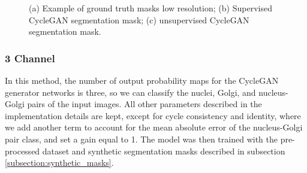 \begin{figure}[!htb]
  \centering
  \hfil
  \hfil 
 
  \caption{(a) Example of ground truth masks low resolution; (b) Supervised CycleGAN segmentation mask; (c) unsupervised CycleGAN segmentation mask.}
  
  \label{fig:lowresolution-cycleGAN}
  
  \end{figure}


\subsubsection*{3 Channel}

In this method, the number of output probability maps for the CycleGAN generator networks is three, so we can classify the nuclei, Golgi, and nucleus-Golgi pairs of the input images. All other parameters described in the implementation details are kept, except for cycle consistency and identity, where we add another term to account for the mean absolute error of the nucleus-Golgi pair class, and set a gain equal to 1. The model was then trained with the pre-processed dataset and synthetic segmentation masks described in subsection \ref{subsection:synthetic_masks}.


